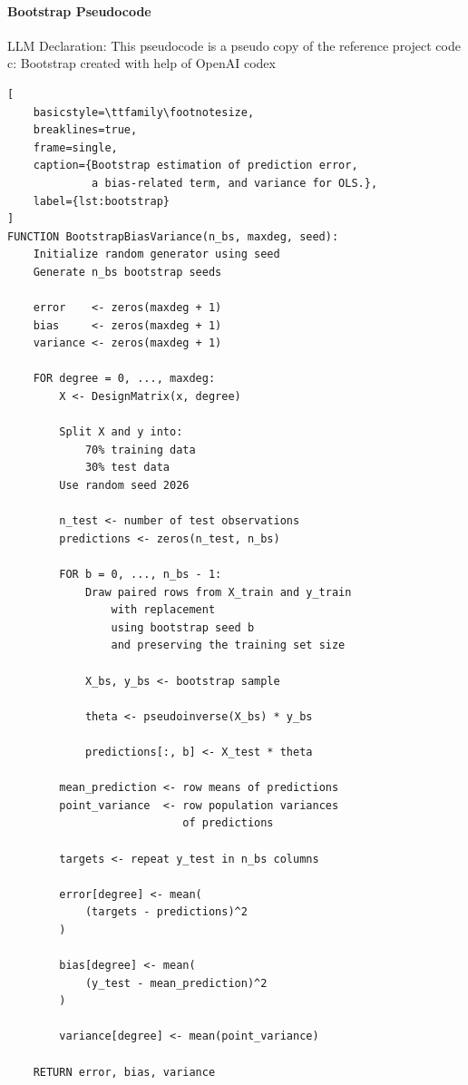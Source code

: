 \documentclass[aps,rmp,reprint,amsmath,amssymb,longbibliography]{revtex4-1}
\begin{document}
\paragraph{Bootstrap Pseudocode}
LLM Declaration:
This pseudocode is a pseudo copy of the reference project code c: Bootstrap \cite{Timholmen96FYSSTK4155Prosjektarbeid}
created with help of OpenAI codex \cite{Codex}
\begin{lstlisting}[
    basicstyle=\ttfamily\footnotesize,
    breaklines=true,
    frame=single,
    caption={Bootstrap estimation of prediction error,
             a bias-related term, and variance for OLS.},
    label={lst:bootstrap}
]
FUNCTION BootstrapBiasVariance(n_bs, maxdeg, seed):
    Initialize random generator using seed
    Generate n_bs bootstrap seeds

    error    <- zeros(maxdeg + 1)
    bias     <- zeros(maxdeg + 1)
    variance <- zeros(maxdeg + 1)

    FOR degree = 0, ..., maxdeg:
        X <- DesignMatrix(x, degree)

        Split X and y into:
            70% training data
            30% test data
        Use random seed 2026

        n_test <- number of test observations
        predictions <- zeros(n_test, n_bs)

        FOR b = 0, ..., n_bs - 1:
            Draw paired rows from X_train and y_train
                with replacement
                using bootstrap seed b
                and preserving the training set size

            X_bs, y_bs <- bootstrap sample

            theta <- pseudoinverse(X_bs) * y_bs

            predictions[:, b] <- X_test * theta

        mean_prediction <- row means of predictions
        point_variance  <- row population variances
                           of predictions

        targets <- repeat y_test in n_bs columns

        error[degree] <- mean(
            (targets - predictions)^2
        )

        bias[degree] <- mean(
            (y_test - mean_prediction)^2
        )

        variance[degree] <- mean(point_variance)

    RETURN error, bias, variance
\end{lstlisting}
\end{document}
